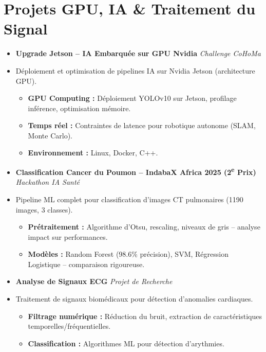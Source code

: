 \documentclass[a4paper,11pt]{article}
\begin{document}
\section{Projets GPU, IA \& Traitement du Signal}
\begin{itemize}[leftmargin=*, label={}]

\item \textbf{Upgrade Jetson -- IA Embarquée sur GPU Nvidia} \hfill \textit{Challenge CoHoMa}
\vspace{-2pt}
\item \small{Déploiement et optimisation de pipelines IA sur Nvidia Jetson (architecture GPU).}
    \begin{itemize}[leftmargin=0.4cm, nosep, label=\tiny$\bullet$]
        \item \small{\textbf{GPU Computing :} Déploiement YOLOv10 sur Jetson, profilage inférence, optimisation mémoire.}
        \item \small{\textbf{Temps réel :} Contraintes de latence pour robotique autonome (SLAM, Monte Carlo).}
        \item \small{\textbf{Environnement :} Linux, Docker, C++.}
    \end{itemize}
    \vspace{3pt}

\item \textbf{Classification Cancer du Poumon -- IndabaX Africa 2025 (2\textsuperscript{e} Prix)} \hfill \textit{Hackathon IA Santé}
\vspace{-2pt}
\item \small{Pipeline ML complet pour classification d'images CT pulmonaires (1190 images, 3 classes).}
    \begin{itemize}[leftmargin=0.4cm, nosep, label=\tiny$\bullet$]
        \item \small{\textbf{Prétraitement :} Algorithme d'Otsu, rescaling, niveaux de gris -- analyse impact sur performances.}
        \item \small{\textbf{Modèles :} Random Forest (98.6\% précision), SVM, Régression Logistique -- comparaison rigoureuse.}
    \end{itemize}
    \vspace{3pt}

\item \textbf{Analyse de Signaux ECG} \hfill \textit{Projet de Recherche}
\vspace{-2pt}
\item \small{Traitement de signaux biomédicaux pour détection d'anomalies cardiaques.}
    \begin{itemize}[leftmargin=0.4cm, nosep, label=\tiny$\bullet$]
        \item \small{\textbf{Filtrage numérique :} Réduction du bruit, extraction de caractéristiques temporelles/fréquentielles.}
        \item \small{\textbf{Classification :} Algorithmes ML pour détection d'arythmies.}
    \end{itemize}
    \vspace{3pt}


\end{itemize}
\end{document}
